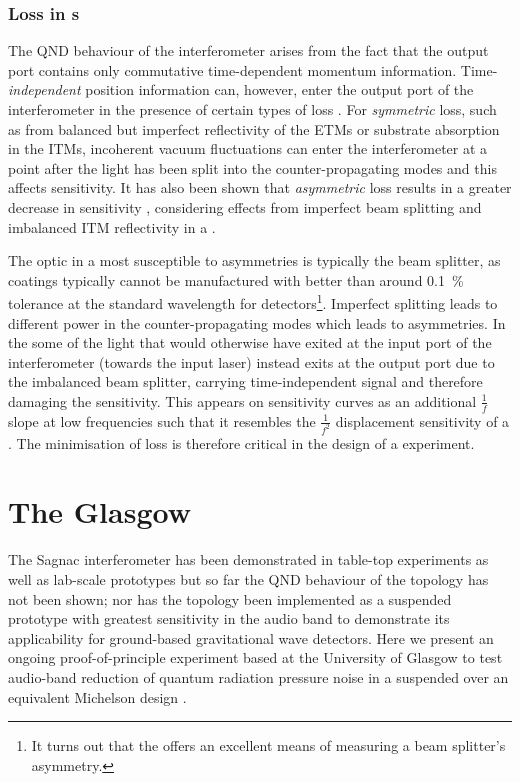 \subsubsection{Loss in \SSM{}s}
The \gls{QND} behaviour of the interferometer arises from the fact that the output port contains only commutative time-dependent momentum information. Time-\emph{independent} position information can, however, enter the output port of the interferometer in the presence of certain types of loss \cite{Danilishin2004}. For \emph{symmetric} loss, such as from balanced but imperfect reflectivity of the \glspl{ETM} or substrate absorption in the \glspl{ITM}, incoherent vacuum fluctuations can enter the interferometer at a point after the light has been split into the counter-propagating modes and this affects sensitivity. It has also been shown that \emph{asymmetric} loss results in a greater decrease in sensitivity \cite{Danilishin2015}, considering effects from imperfect beam splitting and imbalanced \gls{ITM} reflectivity in a \SSM{}.

The optic in a \SSM{} most susceptible to asymmetries is typically the beam splitter, as coatings typically cannot be manufactured with better than around \SI{0.1}{\percent} tolerance at the standard wavelength for detectors\footnote{It turns out that the \SSM{} offers an excellent means of measuring a beam splitter's asymmetry.}. Imperfect splitting leads to different power in the counter-propagating modes which leads to asymmetries. In the \SSM{} some of the light that would otherwise have exited at the input port of the interferometer (towards the input laser) instead exits at the output port due to the imbalanced beam splitter, carrying time-independent signal and therefore damaging the sensitivity. This appears on sensitivity curves as an additional $\frac{1}{f}$ slope at low frequencies such that it resembles the $\frac{1}{f^2}$ displacement sensitivity of a \MI{}. The minimisation of loss is therefore critical in the design of a \SSM{} experiment.

\section{The Glasgow \SSMEXPT{}}
The Sagnac interferometer has been demonstrated in table-top experiments \cite{Shaddock1998} as well as lab-scale prototypes \cite{Beyersdorf2002, Eberle2010} but so far the \gls{QND} behaviour of the \SSM{} topology has not been shown; nor has the topology been implemented as a suspended prototype with greatest sensitivity in the audio band to demonstrate its applicability for ground-based gravitational wave detectors. Here we present an ongoing proof-of-principle experiment based at the University of Glasgow to test audio-band reduction of quantum radiation pressure noise in a suspended \SSM{} over an equivalent Michelson design \cite{Graef2014}.

